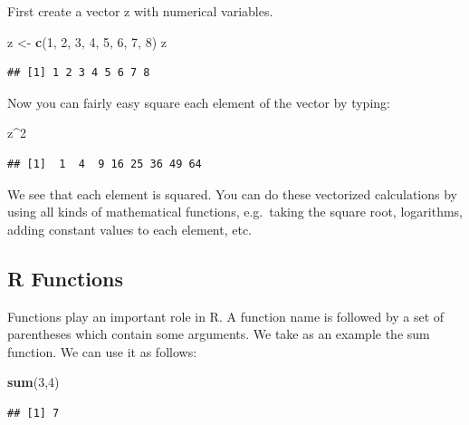\documentclass[
]{book}
\newenvironment{Shaded}{\begin{snugshade}}{\end{snugshade}}
\newcommand{\DecValTok}[1]{\textcolor[rgb]{0.00,0.00,0.81}{#1}}
\newcommand{\KeywordTok}[1]{\textcolor[rgb]{0.13,0.29,0.53}{\textbf{#1}}}
\newcommand{\NormalTok}[1]{#1}
\newcommand{\OperatorTok}[1]{\textcolor[rgb]{0.81,0.36,0.00}{\textbf{#1}}}
\newcommand{\StringTok}[1]{\textcolor[rgb]{0.31,0.60,0.02}{#1}}
\begin{document}
First create a vector z with numerical variables.

\begin{Shaded}
\begin{Highlighting}[]
\NormalTok{z <-}\StringTok{ }\KeywordTok{c}\NormalTok{(}\DecValTok{1}\NormalTok{, }\DecValTok{2}\NormalTok{, }\DecValTok{3}\NormalTok{, }\DecValTok{4}\NormalTok{, }\DecValTok{5}\NormalTok{, }\DecValTok{6}\NormalTok{, }\DecValTok{7}\NormalTok{, }\DecValTok{8}\NormalTok{)}
\NormalTok{z}
\end{Highlighting}
\end{Shaded}

\begin{verbatim}
## [1] 1 2 3 4 5 6 7 8
\end{verbatim}

Now you can fairly easy square each element of the vector by typing:

\begin{Shaded}
\begin{Highlighting}[]
\NormalTok{z}\OperatorTok{^}\DecValTok{2}
\end{Highlighting}
\end{Shaded}

\begin{verbatim}
## [1]  1  4  9 16 25 36 49 64
\end{verbatim}

We see that each element is squared. You can do these vectorized calculations by using all kinds of mathematical functions, e.g.~taking the square root, logarithms, adding constant values to each element, etc.

\hypertarget{r-functions}{%
\subsection{R Functions}\label{r-functions}}

Functions play an important role in R. A function name is followed by a set of parentheses which contain some arguments. We take as an example the sum function. We can use it as follows:

\begin{Shaded}
\begin{Highlighting}[]
\KeywordTok{sum}\NormalTok{(}\DecValTok{3}\NormalTok{,}\DecValTok{4}\NormalTok{)}
\end{Highlighting}
\end{Shaded}

\begin{verbatim}
## [1] 7
\end{verbatim}
\end{document}
